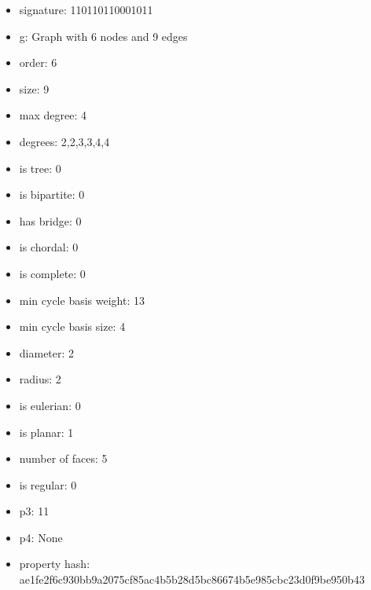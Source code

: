 \begin{itemize}
\item signature: 110110110001011
\item g: Graph with 6 nodes and 9 edges
\item order: 6
\item size: 9
\item max degree: 4
\item degrees: 2,2,3,3,4,4
\item is tree: 0
\item is bipartite: 0
\item has bridge: 0
\item is chordal: 0
\item is complete: 0
\item min cycle basis weight: 13
\item min cycle basis size: 4
\item diameter: 2
\item radius: 2
\item is eulerian: 0
\item is planar: 1
\item number of faces: 5
\item is regular: 0
\item p3: 11
\item p4: None
\item property hash: ae1fe2f6c930bb9a2075cf85ac4b5b28d5bc86674b5e985cbc23d0f9be950b43
\end{itemize}
\newpage
\begin{figure}
\end{figure}
